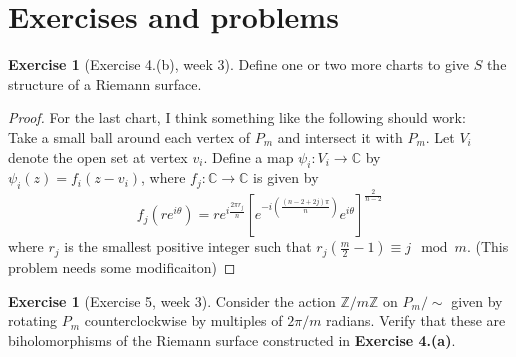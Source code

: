 \documentclass[reqno]{amsart}
\theoremstyle{definition}
\newtheorem{exercise}[theorem]{Exercise}
\theoremstyle{remark}
\begin{document}
\section{Exercises and problems}

\begin{exercise}[Exercise 4.(b), week 3]
    Define one or two more charts to give $S$ the structure of a Riemann
        surface.
\end{exercise}

\begin{proof}
    For the last chart, I think something like the following should work:\\
    Take a small ball around each vertex of $P_m$ and intersect it
        with $P_m$. Let $V_i$ denote the open set at vertex $v_i$.
        Define a map $\psi_i \colon V_i \to \mathbb{C}$ by
        $\psi_i (z) = f_i \left( z - v_i \right) $, where
        $f_j \colon \mathbb{C} \to \mathbb{C}$ is given by
        \[
        f_j(re^{i \theta} ) = r e^{i \frac{2 \pi r_j}{n}} \left[ 
        e^{- i \left( \frac{(n-2 + 2j)\pi}{n} \right) } e^{i \theta}\right]^{\frac{2}{n-2}}
        \] 
        where $r_j$ is the smallest positive integer such that
        $r_j \left( \frac{m}{2}-1 \right) \equiv j \mod{m} $. (This problem needs some modificaiton)
\end{proof}

\begin{exercise}[Exercise 5, week 3]
    Consider the action $\mathbb{Z} / m\mathbb{Z}$ on $P_m / \sim$ given by rotating $P_m$ counterclockwise by multiples of $2\pi/ m$ radians. Verify that these are biholomorphisms of the Riemann surface constructed in \textbf{Exercise 4.(a)}.
\end{exercise}
\end{document}
